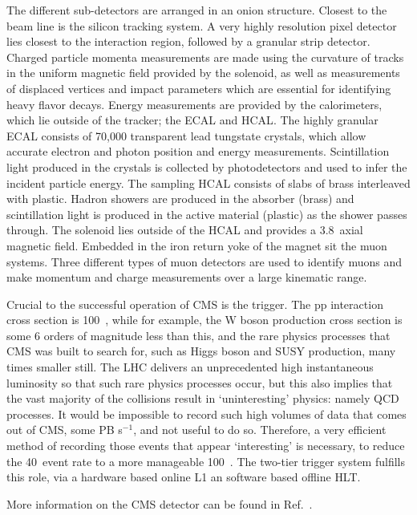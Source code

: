 %
The different sub-detectors are arranged in an onion structure.
%
Closest to the beam line is the silicon tracking system.
A very highly resolution pixel detector lies closest to the interaction region, followed by a granular strip detector.
Charged particle momenta measurements are made using the curvature of tracks in the uniform magnetic field provided by the solenoid, as well as measurements of displaced vertices and impact parameters which are essential for identifying heavy flavor decays. 
%
Energy measurements are provided by the calorimeters, which lie outside of the tracker; the \ac{ECAL} and \ac{HCAL}. 
The highly granular \ac{ECAL} consists of 70,000 transparent lead tungstate crystals, which allow accurate electron and photon position and energy measurements. 
Scintillation light produced in the crystals is collected by photodetectors and used to infer the incident particle energy.
%
The sampling \ac{HCAL} consists of slabs of brass interleaved with plastic. 
Hadron showers are produced in the absorber (brass) and scintillation light is produced in the active material (plastic) as the shower passes through.
%
The solenoid lies outside of the \ac{HCAL} and provides a 3.8~\T axial magnetic field.
%
Embedded in the iron return yoke of the magnet sit the muon systems. 
Three different types of muon detectors are used to identify muons and make momentum and charge measurements over a large kinematic range.
%

%
Crucial to the successful operation of \ac{CMS} is the trigger. 
The pp interaction cross section is 100~\mb, while for example, the W boson production cross section is some 6 orders of magnitude less than this, and the rare physics processes that \ac{CMS} was built to search for, such as Higgs boson and \ac{SUSY} production, many times smaller still.
The \ac{LHC} delivers an unprecedented high instantaneous luminosity so that such rare physics processes occur, but this also implies that the vast majority of the collisions result in `uninteresting' physics: namely \ac{QCD} processes.
It would be impossible to record such high volumes of data that comes out of \ac{CMS}, some PB s$^{-1}$, and not useful to do so.
Therefore, a very efficient method of recording those events that appear `interesting'  
is necessary, to reduce the 40~\MHz event rate to a more manageable 100~\Hz.
The two-tier trigger system fulfills this role, via a hardware based online \ac{L1} an software based offline \ac{HLT}.

%
More information on the CMS detector can be found in Ref.~\cite{Chatrchyan:2008aa}.

